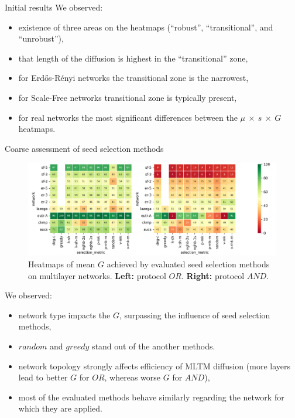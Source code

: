 \documentclass[final]{beamer}
\newlength{\colwidth}
\begin{document}
\begin{frame}[t]
\begin{columns}[t]
\begin{column}{\colwidth}
\begin{block}{Initial results}
    We observed:
    \begin{itemize}
        \item existence of three areas on the heatmaps (“robust”, “transitional”, and “unrobust”),
        \item that length of the diffusion is highest in the “transitional” zone,
        \item for Erdős-Rényi networks the transitional zone is the narrowest,
        \item for Scale-Free networks transitional zone is typically present,
        \item for real networks the most significant differences between the $\mu~\times~s~\times~G$ heatmaps.
    \end{itemize}

\end{block}

\begin{block}{Coarse assessment of seed selection methods}
    \begin{figure}
        \centering
        \includegraphics[width=1\linewidth]{figures/means_multilayer.png}
        \caption{Heatmaps of mean $G$ achieved by evaluated seed 
        selection methods on multilayer networks. \textbf{Left:} protocol 
        $OR$. \textbf{Right:} protocol $AND$.}
        \label{fig:mean_gain_mln}
    \end{figure}
    We observed:
    \begin{itemize}
        \item network type impacts the $G$, surpassing the influence of seed selection methods,
        \item $random$ and $greedy$ stand out of the another methods.
        \item network topology strongly affects efficiency of MLTM diffusion (more layers lead to better $G$ for $OR$, whereas worse $G$ for $AND$),
        \item most of the evaluated methods behave similarly regarding the network for which they are applied.
    \end{itemize}
\end{block}


\end{column}
\end{columns}
\end{frame}
\end{document}
